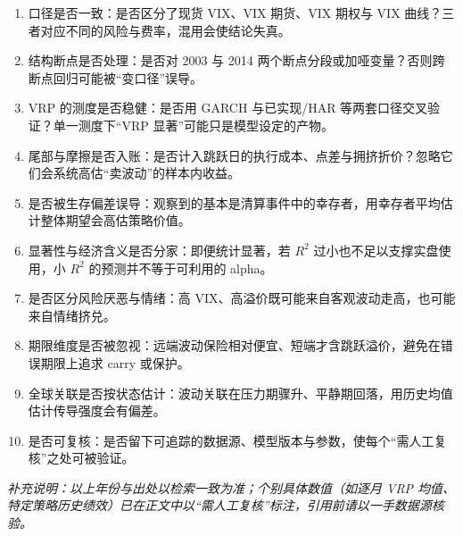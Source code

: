 \documentclass[11pt,a4paper]{ctexart}
\begin{document}
\begin{enumerate}[leftmargin=2em,itemsep=2pt]
\item 口径是否一致：是否区分了现货 VIX、VIX 期货、VIX 期权与 VIX 曲线？三者对应不同的风险与费率，混用会使结论失真。
\item 结构断点是否处理：是否对 2003 与 2014 两个断点分段或加哑变量？否则跨断点回归可能被“变口径”误导。
\item VRP 的测度是否稳健：是否用 GARCH 与已实现/HAR 等两套口径交叉验证？单一测度下“VRP 显著”可能只是模型设定的产物。
\item 尾部与摩擦是否入账：是否计入跳跃日的执行成本、点差与拥挤折价？忽略它们会系统高估“卖波动”的样本内收益。
\item 是否被生存偏差误导：观察到的基本是清算事件中的幸存者，用幸存者平均估计整体期望会高估策略价值。
\item 显著性与经济含义是否分家：即便统计显著，若 $R^2$ 过小也不足以支撑实盘使用，小 $R^2$ 的预测并不等于可利用的 alpha。
\item 是否区分风险厌恶与情绪：高 VIX、高溢价既可能来自客观波动走高，也可能来自情绪挤兑。
\item 期限维度是否被忽视：远端波动保险相对便宜、短端才含跳跃溢价，避免在错误期限上追求 carry 或保护。
\item 全球关联是否按状态估计：波动关联在压力期骤升、平静期回落，用历史均值估计传导强度会有偏差。
\item 是否可复核：是否留下可追踪的数据源、模型版本与参数，使每个“需人工复核”之处可被验证。
\end{enumerate}

\vspace{1em}
\noindent\emph{补充说明：以上年份与出处以检索一致为准；个别具体数值（如逐月 VRP 均值、特定策略历史绩效）已在正文中以“需人工复核”标注，引用前请以一手数据源核验。}
\end{document}
